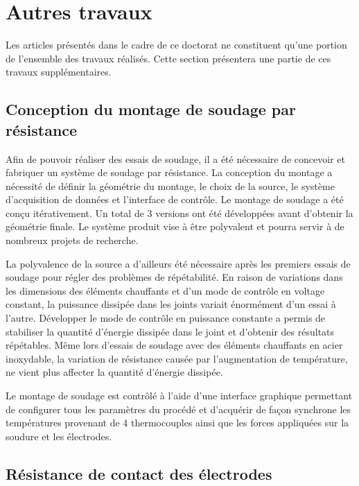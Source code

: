 \label{sec:Discussion}

\section{Autres travaux}

Les articles présentés dans le cadre de ce doctorat ne constituent qu'une portion de l'ensemble des travaux réalisés. 
Cette section présentera une partie de ces travaux supplémentaires. 

\subsection{Conception du montage de soudage par résistance}

Afin de pouvoir réaliser des essais de soudage, il a été nécessaire de concevoir et fabriquer un système de soudage par résistance. 
La conception du montage a nécessité de définir la géométrie du montage, le choix de la source, le système d'acquisition de données et l'interface de contrôle. 
Le montage de soudage a été conçu itérativement.
Un total de 3 versions ont été développées avant d'obtenir la géométrie finale. 
Le système produit vise à être polyvalent et pourra servir à de nombreux projets de recherche. 

La polyvalence de la source a d'ailleurs été nécessaire après les premiers essais de soudage pour régler des problèmes de répétabilité. 
En raison de variations dans les dimensions des éléments chauffants et d'un mode de contrôle en voltage constant, la puissance dissipée dans les joints variait énormément d'un essai à l'autre. 
Développer le mode de contrôle en puissance constante a permis de stabiliser la quantité d'énergie dissipée dans le joint et d'obtenir des résultats répétables. 
Même lors d'essais de soudage avec des éléments chauffants en acier inoxydable, la variation de résistance causée par l'augmentation de température, ne vient plus affecter la quantité d'énergie dissipée. 

Le montage de soudage est contrôlé à l'aide d'une interface graphique permettant de configurer tous les paramètres du procédé et d'acquérir de façon synchrone les températures provenant de 4 thermocouples ainsi que les forces appliquées sur la soudure et les électrodes. 

\FloatBarrier
\subsection{Résistance de contact des électrodes}

